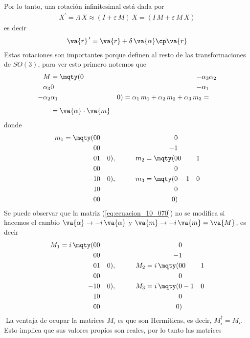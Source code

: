 Por lo tanto, una rotación infinitesimal está dada por
\begin{align}
X^{\prime} = \Lambda \, X \approx ( I + \varepsilon \, M) \, X = (I \, M + \varepsilon \, M \, X)
\label{eq:ecuacion_10_068}
\end{align}
es decir
\begin{align}
\va{r}^{\, \prime} = \va{r} + \delta \, \va{\alpha} \cp \va{r}
\label{eq:ecuacion_10_069}
\end{align}
Estas rotaciones son importantes porque definen al resto de las transformaciones de $SO(3)$, para ver esto primero notemos que
\begin{align}
M &= \mqty(0 & -\alpha_{3} & \alpha_{2} \\ \alpha_{3} & 0 & -\alpha_{1} \\ -\alpha_{2} & \alpha_{1} & 0) = \alpha_{1} \, m_{1} + \alpha_{2} \, m_{2} + \alpha_{3} \, m_{3} = \nonumber \\[0.5em]
&= \va{\alpha} \cdot \va{m} \label{eq:ecuacion_10_070}
\end{align}
donde
\begin{align*}
m_{1} = \mqty(0 & 0 & 0 \\ 0 & 0 & -1 \\ 0 & 1 & 0), \hspace{1cm} m_{2} = \mqty(0 & 0 & 1 \\ 0 & 0 & 0 \\ -1 & 0 & 0), \hspace{1cm} m_{3} = \mqty(0 & -1 & 0 \\ 1 & 0 & 0 \\ 0 & 0 & 0)
\end{align*}
Se puede observar que la matriz (\ref{eq:ecuacion_10_070}) no se modifica si hacemos el cambio $\va{\alpha} \rightarrow - i \, \va{\alpha}$ y $\va{m} \rightarrow - i \, \va{m} = \va{M}$, es decir
\begin{align*}
M_{1} = i \, \mqty(0 & 0 & 0 \\ 0 & 0 & -1 \\ 0 & 1 & 0), \hspace{1cm} M_{2} = i \, \mqty(0 & 0 & 1 \\ 0 & 0 & 0 \\ -1 & 0 & 0), \hspace{1cm} M_{3} = i \, \mqty(0 & -1 & 0 \\ 1 & 0 & 0 \\ 0 & 0 & 0)
\end{align*}
La ventaja de ocupar la matrices $M_{i}$ es que son Hermíticas, es decir, $M_{i}^{\dagger} = M_{i}$. Esto implica que sus valores propios son reales, por lo tanto las matrices
